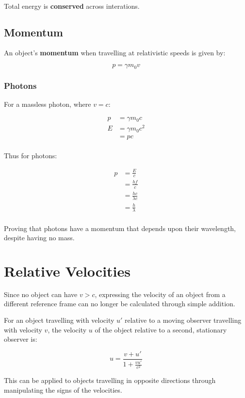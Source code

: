 \documentclass[a4paper,11pt]{report}
\begin{document}
Total energy is \textbf{conserved} across interations.

\subsection{Momentum}

An object's \textbf{momentum} when travelling at relativistic speeds is given
by:

$$
p = \gamma m_0 v
$$

\subsubsection{Photons}

For a massless photon, where $v = c$:

$$
\begin{aligned}
p & = \gamma m_0 c \\
E & = \gamma m_0 c^2 \\
& = pc \\
\end{aligned}
$$

Thus for photons:

$$
\begin{aligned}
p & = \frac{E}{c} \\
& = \frac{hf}{c} \\
& = \frac{hc}{\lambda c} \\
& = \frac{h}{\lambda} \\
\end{aligned}
$$

Proving that photons have a momentum that depends upon their wavelength,
despite having no mass.


\section{Relative Velocities}

Since no object can have $v > c$, expressing the velocity of an object from a
different reference frame can no longer be calculated through simple addition.

For an object travelling with velocity $u'$ relative to a moving observer
travelling with velocity $v$, the velocity $u$ of the object relative to a
second, stationary observer is:

$$
u = \frac{v + u'}{1 + \frac{vu'}{c^2}}
$$

This can be applied to objects travelling in opposite directions through
manipulating the signs of the velocities.
\end{document}
